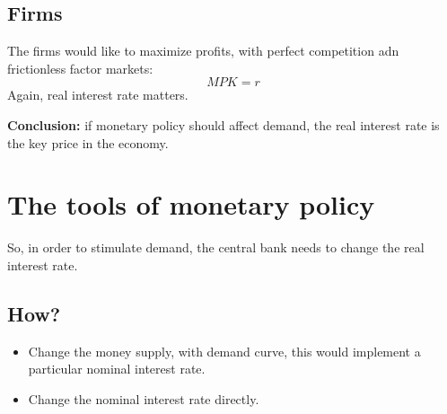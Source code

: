 \subsection{Firms}
The firms would like to maximize profits, with perfect competition adn frictionless factor markets:
\[MPK = r\]
Again, real interest rate matters. 

\textbf{Conclusion:} if monetary policy should affect demand, the real interest rate is the key price in the economy.

\section{The tools of monetary policy}
So, in order to stimulate demand, the central bank needs to change the real interest rate.

\subsection*{How?}

\begin{itemize}
    \item Change the money supply, with demand curve, this would implement a particular nominal interest rate.
    \item Change the nominal interest rate directly.
\end{itemize}

